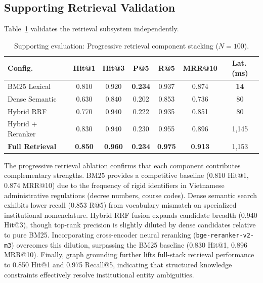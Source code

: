 \FloatBarrier
\subsection{Supporting Retrieval Validation}
\label{sec:retrieval_results}

Table~\ref{tab:retrieval_evaluation} validates the retrieval subsystem independently.

\begin{table}[!htbp]
\centering
\caption{Supporting evaluation: Progressive retrieval component stacking ($N=100$).}
\label{tab:retrieval_evaluation}
{\small\setlength{\tabcolsep}{3pt}
\begin{tabular}{lcccccc}
\toprule
\textbf{Config.} & \textbf{Hit@1} & \textbf{Hit@3} & \textbf{P@5} & \textbf{R@5} & \textbf{MRR@10} & \textbf{Lat.\,(ms)} \\
\midrule
BM25 Lexical          & 0.810 & 0.920 & \textbf{0.234} & 0.937 & 0.874 & \textbf{14} \\
Dense Semantic        & 0.630 & 0.840 & 0.202 & 0.853 & 0.736 & 80 \\
Hybrid RRF            & 0.770 & 0.940 & 0.222 & 0.935 & 0.851 & 80 \\
Hybrid + Reranker     & 0.830 & 0.940 & 0.230 & 0.955 & 0.896 & 1{,}145 \\
\textbf{Full Retrieval} & \textbf{0.850} & \textbf{0.960} & \textbf{0.234} & \textbf{0.975} & \textbf{0.913} & 1{,}153 \\
\bottomrule
\end{tabular}}
\end{table}

The progressive retrieval ablation confirms that each component contributes complementary strengths. BM25 provides a competitive baseline (0.810 Hit@1, 0.874 MRR@10) due to the frequency of rigid identifiers in Vietnamese administrative regulations (decree numbers, course codes). Dense semantic search exhibits lower recall (0.853 R@5) from vocabulary mismatch on specialized institutional nomenclature. Hybrid RRF fusion expands candidate breadth (0.940 Hit@3), though top-rank precision is slightly diluted by dense candidates relative to pure BM25. Incorporating cross-encoder neural reranking (\texttt{bge-reranker-v2-m3}) overcomes this dilution, surpassing the BM25 baseline (0.830 Hit@1, 0.896 MRR@10). Finally, graph grounding further lifts full-stack retrieval performance to 0.850 Hit@1 and 0.975 Recall@5, indicating that structured knowledge constraints effectively resolve institutional entity ambiguities.

